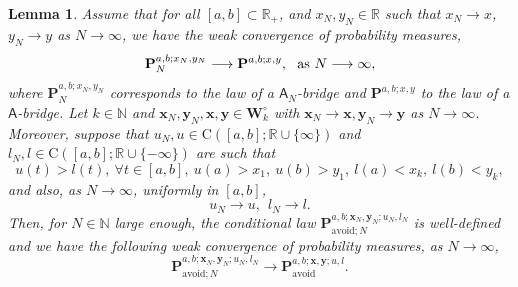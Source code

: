 \documentclass[]{article}
\newtheorem{lem}[thm]{Lemma}
\begin{document}
\begin{lem}\label{Lem-CondDistConv}
Assume that for all $[a,b] \subset \mathbb{R}_+$, and $x_N,y_N \in \mathbb{R}$ such that $x_N \to x$, $y_N \to y$ as $N \to \infty$, we have the weak convergence of probability measures,
\begin{equation}\label{SingleBridgeConv}
\mathbf{P}_N^{a,b;x_N,y_N} \longrightarrow \mathbf{P}^{a,b;x,y}, \ \textnormal{ as } N \longrightarrow \infty,
\end{equation}
where $\mathbf{P}_N^{a,b;x_N,y_N}$ corresponds to the law of a $\mathsf{A}_N$-bridge and $\mathbf{P}^{a,b;x,y}$ to the law of a $\mathsf{A}$-bridge.  Let $k\in \mathbb{N}$ and $\mathbf{x}_N,\mathbf{y}_N, \mathbf{x},\mathbf{y}\in \mathbf{W}_{k}^\circ$ with $\mathbf{x}_N \to \mathbf{x}, \mathbf{y}_N \to \mathbf{y}$ as $N \to \infty$. Moreover, suppose that $u_N,u \in \mathrm{C}([a,b];\mathbb{R}\cup \{ \infty \})$ and $l_N,l \in \mathrm{C}([a,b];\mathbb{R}\cup \{ -\infty \})$ are such that 
\begin{equation*}
u(t)>l(t), \ \forall t \in [a,b], \ u(a)>x_1, \ u(b)>y_1, \ l(a)<x_k, \ l(b)<y_k,
\end{equation*}
and also, as $N \to \infty$, uniformly in $[a,b]$,
\begin{equation}\label{BoundaryConvergence}
u_N \longrightarrow u, \ \ l_N \longrightarrow l.
\end{equation}
Then, for $N \in \mathbb{N}$ large enough, the conditional law $\mathbf{P}_{\mathrm{avoid};N}^{a,b;\mathbf{x}_N,\mathbf{y}_N;u_N,l_N}$ is well-defined and we have the following weak convergence of probability measures, as $N \longrightarrow \infty$,
\begin{equation}\label{ConditionedBridgeConv}
\mathbf{P}_{\mathrm{avoid};N}^{a,b;\mathbf{x}_N,\mathbf{y}_N;u_N,l_N}\longrightarrow \mathbf{P}_{\mathrm{avoid}}^{a,b;\mathbf{x},\mathbf{y};u,l}.
\end{equation}
\end{lem}
\end{document}
